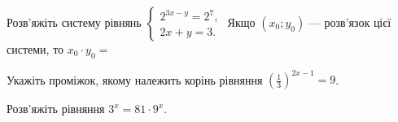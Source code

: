 \documentclass[12pt]{article}
\begin{document}
\begingroup\setcounter{zad}{0}
\providecommand{\trigStyle}[1]{#1}
\providecommand{\answerTableSmall}[5]{%
\begingroup\setlength{\tabcolsep}{2pt}\small\nmtSetCell
\begin{tabular}{|*{5}{>{\centering\arraybackslash}m{\nmtcellw}|}}
\hline
\rule[-0.2cm]{0pt}{0.6cm}\textbf{А} & \textbf{Б} & \textbf{В} & \textbf{Г} & \textbf{Д} \\
\hline
\rule[-0.4cm]{0pt}{0.9cm}#1 & \rule[-0.4cm]{0pt}{0.9cm}#2 & \rule[-0.4cm]{0pt}{0.9cm}#3 & \rule[-0.4cm]{0pt}{0.9cm}#4 & \rule[-0.4cm]{0pt}{0.9cm}#5 \\
\hline
\end{tabular}\endgroup}
\providecommand{\answerListVertical}[5]{\nmtOptions{#1}{#2}{#3}{#4}{#5}}

\par\vspace{0.2cm}


\begin{samepage}
\noindent\zadnum Розв'яжіть систему рівнянь $\begin{cases} 2^{3x-y} = 2^7, \\ 2x + y = 3. \end{cases}$ Якщо $(x_0; y_0)$ --- розв'язок цієї системи, то $x_0 \cdot y_0 =$ 

\nmtnobreak
{}
\par{}
\end{samepage}

\begin{samepage}
\noindent\zadnum Укажіть проміжок, якому належить корінь рівняння $\left(\displaystyle\frac{1}{3}\right)^{2x-1} = 9$. 

\nmtnobreak
\answerTable{$[2; +\infty)$}{$(-2; 0]$}{$(-\infty; -2]$}{$[1; 2)$}{$(0; 1]$}
\par{}
\end{samepage}

\begin{samepage}
\noindent\zadnum Розв'яжіть рівняння $3^x = 81 \cdot 9^x$. 

\nmtnobreak
{}
\par{}
\end{samepage}
\end{document}
